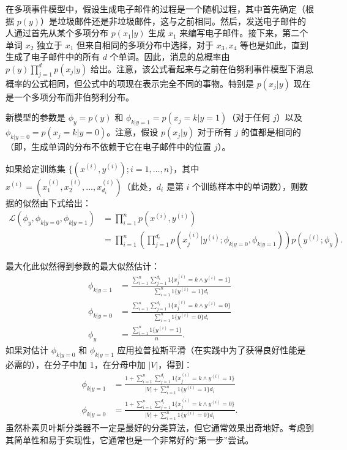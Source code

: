 在多项事件模型中，假设生成电子邮件的过程是一个随机过程，其中首先确定（根据 $p(y)$）是垃圾邮件还是非垃圾邮件，这与之前相同。然后，发送电子邮件的人通过首先从某个多项分布 $p(x_1|y)$ 生成 $x_1$ 来编写电子邮件。接下来，第二个单词 $x_2$ 独立于 $x_1$ 但来自相同的多项分布中选择，对于 $x_3, x_4$ 等也是如此，直到生成了电子邮件中的所有 $d$ 个单词。因此，消息的总概率由 $p(y) \prod_{j=1}^d p(x_j|y)$ 给出。注意，该公式看起来与之前在伯努利事件模型下消息概率的公式相同，但公式中的项现在表示完全不同的事物。特别是 $p(x_j|y)$ 现在是一个多项分布而非伯努利分布。

新模型的参数是 $\phi_y = p(y)$ 和 $\phi_{k|y=1} = p(x_j = k | y = 1)$（对于任何 $j$）以及 $\phi_{k|y=0} = p(x_j = k | y = 0)$。注意，假设 $p(x_j|y)$ 对于所有 $j$ 的值都是相同的（即，生成单词的分布不依赖于它在电子邮件中的位置 $j$）。

如果给定训练集 $\{(x^{(i)}, y^{(i)}); i=1, \dots, n\}$，其中 $x^{(i)} = (x_1^{(i)}, x_2^{(i)}, \dots, x_{d_i}^{(i)})$（此处，$d_i$ 是第 $i$ 个训练样本中的单词数），则数据的似然由下式给出：
\begin{align*}
    \mathcal{L}(\phi_y, \phi_{k|y=0}, \phi_{k|y=1}) &= \prod_{i=1}^n p(x^{(i)}, y^{(i)})\\
    &= \prod_{i=1}^n \left( \prod_{j=1}^{d_i} p(x_j^{(i)} | y^{(i)}; \phi_{k|y=0}, \phi_{k|y=1}) \right) p(y^{(i)}; \phi_y).
\end{align*}

最大化此似然得到参数的最大似然估计：
\begin{align*} 
    \phi_{k|y=1} &= \frac{\sum_{i=1}^n \sum_{j=1}^{d_i} {1}\{x_j^{(i)} = k \wedge y^{(i)} = 1\}}{\sum_{i=1}^n {1}\{y^{(i)} = 1\} d_i} \\ 
    \phi_{k|y=0} &= \frac{\sum_{i=1}^n \sum_{j=1}^{d_i} {1}\{x_j^{(i)} = k \wedge y^{(i)} = 0\}}{\sum_{i=1}^n {1}\{y^{(i)} = 0\} d_i} \\ 
    \phi_y &= \frac{\sum_{i=1}^n {1}\{y^{(i)} = 1\}}{n}. 
\end{align*}
如果对估计 $\phi_{k|y=0}$ 和 $\phi_{k|y=1}$ 应用拉普拉斯平滑（在实践中为了获得良好性能是必需的），在分子中加 1，在分母中加 $|V|$，得到：
\begin{align*} 
    \phi_{k|y=1} &= \frac{1 + \sum_{i=1}^n \sum_{j=1}^{d_i} {1}\{x_j^{(i)} = k \wedge y^{(i)} = 1\}}{|V| + \sum_{i=1}^n {1}\{y^{(i)} = 1\} d_i} \\ 
    \phi_{k|y=0} &= \frac{1 + \sum_{i=1}^n \sum_{j=1}^{d_i} {1}\{x_j^{(i)} = k \wedge y^{(i)} = 0\}}{|V| + \sum_{i=1}^n {1}\{y^{(i)} = 0\} d_i}. 
\end{align*}
虽然朴素贝叶斯分类器不一定是最好的分类算法，但它通常效果出奇地好。考虑到其简单性和易于实现性，它通常也是一个非常好的“第一步”尝试。